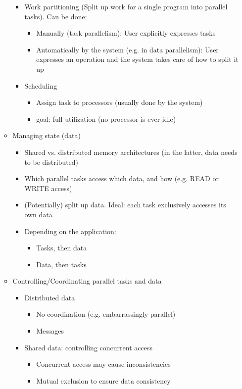 \documentclass[a4paper]{article}
\begin{document}
\begin{itemize}
\begin{itemize}
\begin{itemize}
\item Work partitioning (Split up work for a single program into parallel tasks). Can be done:
\begin{itemize}
\item Manually (task parallelism): User explicitly expresses tasks
\item Automatically by the system (e.g. in data parallelism): User expresses an operation and the system takes care of how to split it up 
\end{itemize}
\item Scheduling
\begin{itemize}
\item Assign task to processors (usually done by the system)
\item goal: full utilization (no processor is ever idle)
\end{itemize}
\end{itemize}
\item Managing state (data)
\begin{itemize}
\item Shared vs. distributed memory architectures (in the latter, data needs to be distributed)
\item Which parallel tasks access which data, and how (e.g. READ or WRITE access)
\item (Potentially) split up data. Ideal: each task exclusively accesses its own data
\item Depending on the application:
\begin{itemize}
\item Tasks, then data
\item Data, then tasks
\end{itemize}
\end{itemize}
\item Controlling/Coordinating parallel tasks and data
\begin{itemize}
\item Distributed data
\begin{itemize}
\item No coordination (e.g. embarrassingly parallel)
\item Messages
\end{itemize}
\item Shared data: controlling concurrent access
\begin{itemize}
\item Concurrent access may cause inconsistencies
\item Mutual exclusion to ensure data consistency

\end{itemize}
\end{itemize}
\end{itemize}
\end{itemize}
\end{document}
